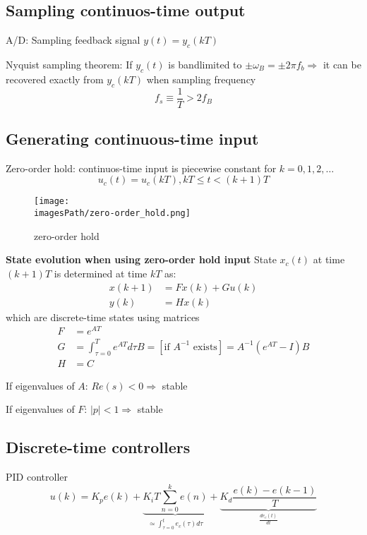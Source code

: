 \documentclass{article}
\newcommand{\imagesPath}{images}
\begin{document}
\subsection{Sampling continuos-time output}
A/D: Sampling feedback signal $y(t)=y_c(kT)$

Nyquist sampling theorem:
If $y_c(t)$ is bandlimited to $\pm\omega_B = \pm2\pi f_b \Rightarrow$
it can be recovered exactly from $y_c(kT)$ when sampling frequency
\begin{equation*}
    f_s \equiv \frac{1}{T} > 2f_B
\end{equation*}

\newpage
\subsection{Generating continuous-time input}
Zero-order hold: continuos-time input is piecewise constant for $k=0,1,2,\ldots$
\begin{equation*}
    u_c(t) = u_c(kT), kT\leq t < (k+1)T
\end{equation*}

\begin{figure}[!h]
    \centering
    \texttt{[image: \\imagesPath/zero-order\_hold.png]}
    \caption{zero-order hold}
\end{figure}

\textbf{State evolution when using zero-order hold input} \newline
State $x_c(t)$ at time $(k+1)T$ is determined at time $kT$ as:
\begin{align*}
    x(k+1) &= Fx(k)+Gu(k) \\
    y(k) &= Hx(k)
\end{align*}
which are discrete-time states using matrices
\begin{align*}
    F &= e^{AT} \\
    G &= \int_{\tau=0}^{T} e^{AT} d\tau B = [\text{if } A^{-1} \text{ exists}] = A^{-1}(e^{AT}-I)B \\
    H &= C
\end{align*}

If eigenvalues of $A$: $Re(s) < 0 \Rightarrow$ stable

If eigenvalues of $F$: $|p|<1 \Rightarrow$ stable

\subsection{Discrete-time controllers}
PID controller 
\begin{equation*}
    u(k) = K_p e(k) + \underbrace{K_i T\sum_{n=0}^{k} e(n)}_{\simeq\int_{\tau=0}^te_c(\tau)d\tau} + \underbrace{K_d\frac{e(k)-e(k-1)}{T}}_{\frac{de_c(t)}{dt}}
\end{equation*}
\end{document}
